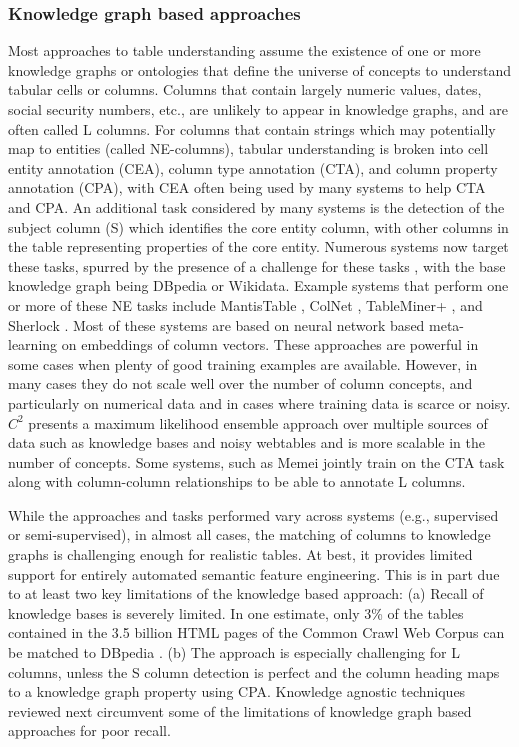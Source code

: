 \documentclass[sigconf, nonacm]{acmart}
\begin{document}
\subsubsection{Knowledge graph based approaches}
Most approaches to table understanding assume the existence of one or more knowledge graphs or ontologies that define the universe of concepts to understand tabular cells or columns.  Columns that contain largely numeric values, dates, social security numbers, etc., are unlikely to appear in knowledge graphs, and are often called L columns.  For columns that contain strings which may potentially map to entities (called NE-columns), tabular understanding is broken into cell entity annotation (CEA), column type annotation (CTA), and column property annotation (CPA), with CEA often being used by many systems to help CTA and CPA.  An additional task considered by many systems is the detection of the subject column (S) which identifies the core entity column, with other columns in the table representing properties of the core entity.  Numerous systems now target these tasks, spurred by the presence of a challenge for these tasks \cite{semtab2019}, with the base knowledge graph being DBpedia or Wikidata.  Example systems that perform one or more of these NE tasks include MantisTable \cite{DBLP:journals/fgcs/CremaschiPRS20}, ColNet \cite{city22932}, TableMiner+ \cite{10.1007/978-3-319-18818-8_25}, and Sherlock \cite{10.1145/3292500.3330993}. Most of these systems are based on neural network based meta-learning on embeddings of column vectors. These approaches are powerful in some cases when plenty of good training examples are available. However, in many cases they do not scale well over the number of column concepts, and particularly on numerical data and in cases where training data is scarce or noisy. $C^2$\cite{khurana2020semantic} presents a maximum likelihood ensemble approach over multiple sources of data such as knowledge bases and noisy webtables and is more scalable in the number of concepts. Some systems, such as Memei \cite{Takeoka_Oyamada_Nakadai_Okadome_2019} jointly train on the CTA task along with column-column relationships to be able to annotate L columns.  

While the approaches and tasks performed vary across systems (e.g., supervised or semi-supervised), in almost all cases, the matching of columns to knowledge graphs is challenging enough for realistic tables. At best, it provides limited support for entirely automated semantic feature engineering.  This is in part due to at least two key limitations of the knowledge based approach: (a) Recall of knowledge bases is severely limited.  In one estimate, only 3\% of the tables contained in the 3.5 billion HTML pages of the Common Crawl Web Corpus can be matched to
DBpedia \cite{10.1145/2872427.2883017}. (b) The approach is especially challenging for L columns, unless the S column detection is perfect and the column heading maps to a knowledge graph property using CPA.  Knowledge agnostic techniques reviewed next circumvent some of the limitations of knowledge graph based approaches for poor recall.
\end{document}
